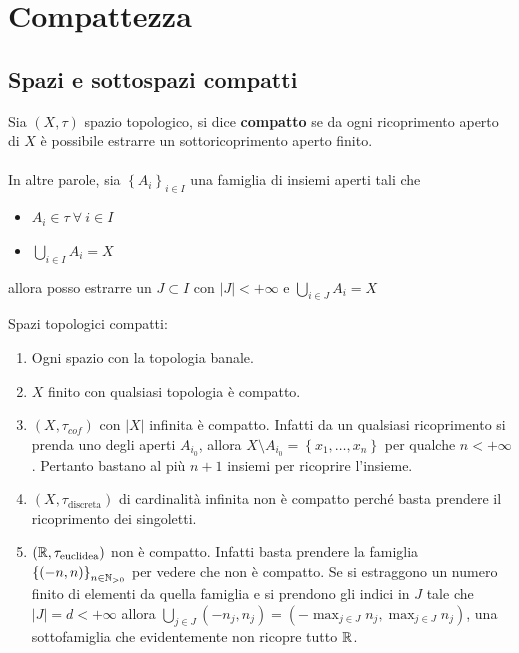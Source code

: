 \section{Compattezza}
\subsection{\textcolor{TopGener}{\textbf{Spazi e sottospazi compatti}}}



\begin{definition}
	Sia $(X, \tau)$ spazio topologico, si dice \textbf{compatto} se da ogni ricoprimento aperto di $X$ è possibile estrarre un sottoricoprimento aperto finito. \\ \\ In altre parole, sia $\left\{A_i\right\}_{i\in I}$ una famiglia di insiemi aperti tali che
	\begin{itemize}
		\item $A_i \in \tau \ \forall \ i\in I$
		\item $\bigcup_{i \in I} A_i = X$
	\end{itemize}
	allora posso estrarre un $J \subset I$ con $|J| < +\infty$ e $\bigcup_{i \in J} A_i = X$
\end{definition} 

\begin{example} Spazi topologici compatti:
\begin{enumerate}
	\item Ogni spazio con la topologia banale.
	\item $X$ finito con qualsiasi topologia è compatto.
	\item $(X, \tau_{cof})$ con $|X|$ infinita è compatto. Infatti da un qualsiasi ricoprimento si prenda uno degli aperti $A_{i_0}$, allora $X \setminus A_{i_0} = \left\{x_1, \dots, x_n\right\}$ per qualche $n < +\infty$. Pertanto bastano al più $n+1$ insiemi per ricoprire l'insieme.
	\item $(X,\tau_{\text{discreta}})$ di cardinalità infinita non è compatto perché basta prendere il ricoprimento dei singoletti.
	\item $(\mathbb{R}, \tau_{\text{euclidea}})$ non è compatto. Infatti basta prendere la famiglia $\left\{(-n, n)\right\}_{n \in \mathbb{N}_{>0}}$ per vedere che non è compatto. Se si estraggono un numero finito di elementi da quella famiglia e si prendono gli indici in $J$ tale che $|J| = d < +\infty$ allora $\bigcup_{j \in J}(-n_j, n_j) = (-\max_{j \in J} n_j,  \max_{j \in J} n_j)$, una sottofamiglia che evidentemente non ricopre tutto $\mathbb{R}$.
\end{enumerate}
\end{example}


